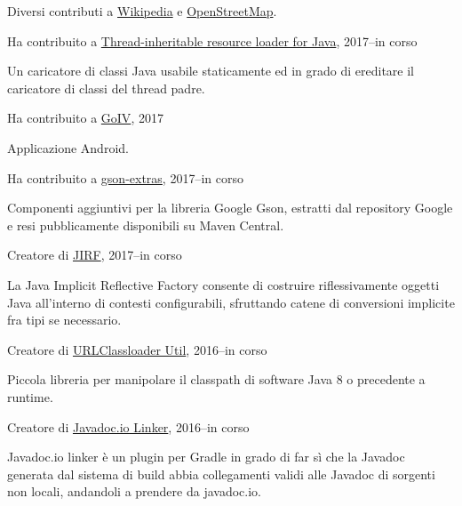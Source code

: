 \documentclass[10pt]{article}
\newenvironment{innerlist}[1][\enskip\textbullet]%
        {\begin{compactitem}[#1]}{\end{compactitem}}
\newcommand{\halfblankline}{\quad\vspace{-0.5\baselineskip}\pagebreak[3]}
\begin{document}
Diversi contributi a \href{http://www.wikipedia.org/}{Wikipedia} e \href{http://www.openstreetmap.org/}{OpenStreetMap}.

\halfblankline{}

Ha contribuito a \href{https://github.com/DanySK/Thread-Inheritable-Resource-Loader-for-Java}{Thread-inheritable resource loader for Java}, 2017--in corso
\begin{innerlist}
    \item Un caricatore di classi Java usabile staticamente ed in grado di ereditare il caricatore di classi del thread padre.
\end{innerlist}
\halfblankline

Ha contribuito a \href{https://github.com/farkam135/GoIV}{GoIV}, 2017
\begin{innerlist}
    \item Applicazione Android.
\end{innerlist}
\halfblankline

Ha contribuito a \href{https://github.com/DanySK/gson-extras}{gson-extras}, 2017--in corso
\begin{innerlist}
    \item Componenti aggiuntivi per la libreria Google Gson, estratti dal repository Google  e resi pubblicamente disponibili su Maven Central.
\end{innerlist}
\halfblankline

Creatore di \href{https://github.com/DanySK/jirf}{JIRF}, 2017--in corso
\begin{innerlist}
    \item La Java Implicit Reflective Factory consente di costruire riflessivamente oggetti Java all'interno di contesti configurabili, sfruttando catene di conversioni implicite fra tipi se necessario.
\end{innerlist}
\halfblankline

Creatore di \href{https://github.com/DanySK/urlclassloader-util}{URLClassloader Util}, 2016--in corso
\begin{innerlist}
    \item Piccola libreria per manipolare il classpath di software Java 8 o precedente a runtime.
\end{innerlist}
\halfblankline

Creatore di \href{https://github.com/DanySK/javadoc.io-linker}{Javadoc.io Linker}, 2016--in corso
\begin{innerlist}
    \item Javadoc.io linker è un plugin per Gradle in grado di far sì che la Javadoc generata dal sistema di build abbia collegamenti validi alle Javadoc di sorgenti non locali, andandoli a prendere da javadoc.io.
\end{innerlist}
\halfblankline
\end{document}
